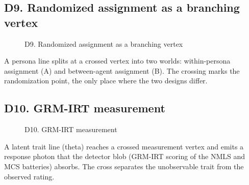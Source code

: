 \documentclass[11pt,a4paper]{article}
\begin{document}
\subsection*{D9. Randomized assignment as a branching vertex}
\begin{figure}[H]
\centering

\caption{D9. Randomized assignment as a branching vertex}
\end{figure}
A persona line splits at a crossed vertex into two worlds: within-persona assignment (A) and between-agent assignment (B). The crossing marks the randomization point, the only place where the two designs differ.

\subsection*{D10. GRM-IRT measurement}
\begin{figure}[H]
\centering

\caption{D10. GRM-IRT measurement}
\end{figure}
A latent trait line (theta) reaches a crossed measurement vertex and emits a response photon that the detector blob (GRM-IRT scoring of the NMLS and MCS batteries) absorbs. The cross separates the unobservable trait from the observed rating.
\end{document}
